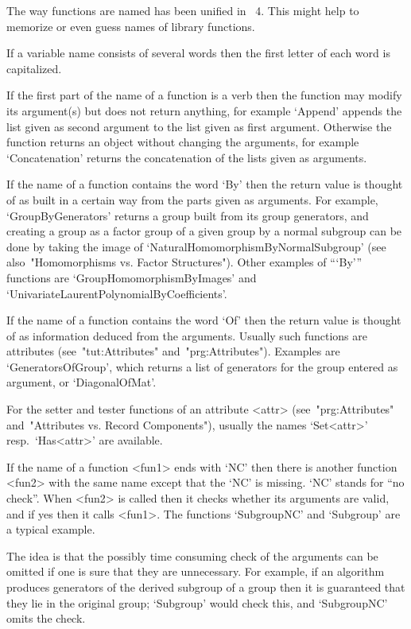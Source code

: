 
The way functions are named has been unified in {\GAP}~4.
This might help to memorize or even guess names of library functions.

If a variable name consists of several words then the first
letter of each word is capitalized.

If the first part of the name of a function is a verb then the function
may modify its argument(s) but does not return anything,
for example `Append' appends the list given as second argument to the
list given as first argument.
Otherwise the function returns an object without changing the arguments,
for example `Concatenation' returns the concatenation of the lists
given as arguments.

If the name of a function contains the word `By' then the return value is
thought of as built in a certain way from the parts given as arguments.
For example, `GroupByGenerators' returns a group built from its group
generators, and creating a group as a factor group of a given group
by a normal subgroup can be done by taking the image of
`NaturalHomomorphismByNormalSubgroup'
(see also~"Homomorphisms vs. Factor Structures").
Other examples of ```By''' functions are `GroupHomomorphismByImages' and
`UnivariateLaurentPolynomialByCoefficients'.

If the name of a function contains the word `Of' then the return value is
thought of as information deduced from the arguments.
Usually such functions are attributes
(see~"tut:Attributes" and~"prg:Attributes").
Examples are `GeneratorsOfGroup', which returns a list of generators for
the group entered as argument, or `DiagonalOfMat'.

For the setter and tester functions of an attribute <attr>
(see~"prg:Attributes" and~"Attributes vs. Record Components"),
usually the names `Set<attr>' resp.~`Has<attr>' are available.

If the name of a function <fun1> ends with `NC' then there is another
function <fun2> with the same name except that the `NC' is missing.
`NC' stands for ``no check''.
When <fun2> is called then it checks whether its arguments are valid,
and if yes then it calls <fun1>.
The functions `SubgroupNC' and `Subgroup' are a typical example.

The idea is that the possibly time consuming check of the arguments
can be omitted if one is sure that they are unnecessary.
For example, if an algorithm produces generators of the derived subgroup
of a group then it is guaranteed that they lie in the original group;
`Subgroup' would check this, and `SubgroupNC' omits the check.

